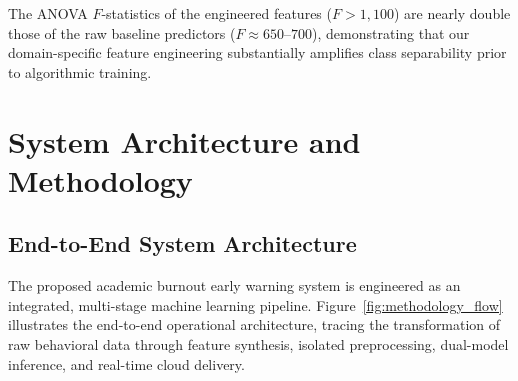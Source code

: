 \documentclass[12pt,a4paper,oneside]{report}
\begin{document}
The ANOVA $F$-statistics of the engineered features ($F > 1,100$) are nearly double those of the raw baseline predictors ($F \approx 650$--$700$), demonstrating that our domain-specific feature engineering substantially amplifies class separability prior to algorithmic training.


\chapter{System Architecture and Methodology}
\label{ch:methodology}

\section{End-to-End System Architecture}
\label{sec:system_architecture}
The proposed academic burnout early warning system is engineered as an integrated, multi-stage machine learning pipeline. Figure~\ref{fig:methodology_flow} illustrates the end-to-end operational architecture, tracing the transformation of raw behavioral data through feature synthesis, isolated preprocessing, dual-model inference, and real-time cloud delivery.
\end{document}
